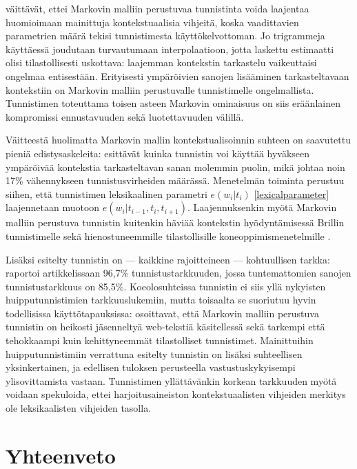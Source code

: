 \documentclass[utf8,bachelor,manualbib]{gradu3}
\begin{document}
 väittävät, ettei Markovin malliin perustuvaa tunnistinta voida laajentaa huomioimaan mainittuja kontekstuaalisia vihjeitä, koska vaadittavien parametrien määrä tekisi tunnistimesta käyttökelvottoman. Jo trigrammeja käyttäessä joudutaan turvautumaan interpolaatioon, jotta laskettu estimaatti olisi tilastollisesti uskottava: laajemman kontekstin tarkastelu vaikeuttaisi ongelmaa entisestään. Erityisesti ympäröivien sanojen lisääminen tarkasteltavaan kontekstiin on Markovin malliin perustuvalle tunnistimelle ongelmallista. Tunnistimen toteuttama toisen asteen Markovin ominaisuus on siis eräänlainen kompromissi ennustavuuden sekä luotettavuuden välillä.

Väitteestä huolimatta Markovin mallin kontekstualisoinnin suhteen on saavutettu pieniä edistysaskeleita:  esittävät kuinka tunnistin voi käyttää hyväkseen ympäröivää kontekstia tarkasteltavan sanan molemmin puolin, mikä johtaa noin 17\% vähennykseen tunnistusvirheiden määrässä. Menetelmän toiminta perustuu siihen, että tunnistimen leksikaalinen parametri $e(w_i|t_i)$ \eqref{lexicalparameter} laajennetaan muotoon $e(w_i|t_{i-1}, t_i, t_{i+1})$. Laajennuksenkin myötä Markovin malliin perustuva tunnistin kuitenkin häviää kontekstin hyödyntämisessä Brillin tunnistimelle sekä hienostuneemmille tilastollisille koneoppimismenetelmille \citep[mm.][]{toutanova2003}.

Lisäksi esitelty tunnistin on --- kaikkine rajoitteineen --- kohtuullisen tarkka: \citet{brants2000} raportoi artikkelissaan 96,7\% tunnistustarkkuuden, jossa tuntemattomien sanojen tunnistustarkkuus on 85,5\%. Koeolosuhteissa tunnistin ei siis yllä nykyisten huipputunnistimien tarkkuuslukemiin, mutta toisaalta se suoriutuu hyvin todellisissa käyttötapauksissa:  osoittavat, että Markovin malliin perustuva tunnistin on heikosti jäsenneltyä web-tekstiä käsitellessä sekä tarkempi että tehokkaampi kuin kehittyneemmät tilastolliset tunnistimet. Mainittuihin huipputunnistimiin verrattuna esitelty tunnistin on lisäksi suhteellisen yksinkertainen, ja edellisen tuloksen perusteella vastustuskykyisempi ylisovittamista vastaan. Tunnistimen yllättävänkin korkean tarkkuuden myötä voidaan spekuloida, ettei harjoitusaineiston kontekstuaalisten vihjeiden merkitys ole leksikaalisten vihjeiden tasolla.


\chapter{Yhteenveto}
\end{document}
